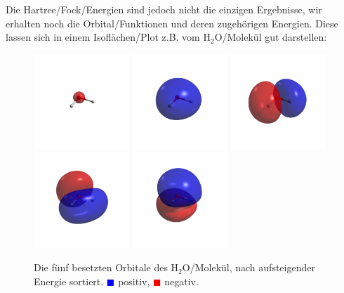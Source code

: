 Die Hartree\-/Fock\-/Energien sind jedoch nicht die einzigen Ergebnisse,
wir erhalten noch die Orbital\-/Funktionen und deren zugehörigen Energien.
Diese lassen sich in einem Isoflächen\-/Plot z.B. vom H$_2$O\-/Molekül gut darstellen:
\begin{figure}[h]
    \centering
\includegraphics[trim=650 650 650 650, clip, width=0.32\textwidth]{res/H2O/h2o_w0.png}
\includegraphics[trim=650 650 650 650, clip, width=0.32\textwidth]{res/H2O/h2o_w1.png}
\includegraphics[trim=650 650 650 650, clip, width=0.32\textwidth]{res/H2O/h2o_w2.png}\\
\includegraphics[trim=650 650 650 650, clip, width=0.32\textwidth]{res/H2O/h2o_w3.png}
\includegraphics[trim=650 650 650 650, clip, width=0.32\textwidth]{res/H2O/h2o_w4.png}
\caption{Die fünf besetzten Orbitale des H$_2$O\-/Molekül,
nach aufsteigender Energie sortiert.
\textcolor{blue}{$\blacksquare$} positiv,
\textcolor{red}{$\blacksquare$} negativ.}\label{h2o_orbitals}
\end{figure}